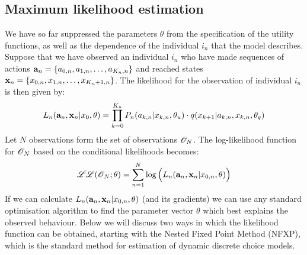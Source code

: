 
\subsection{Maximum likelihood estimation}
We have so far suppressed the parameters $\theta$ from the specification of the utility functions, as well as the dependence of the individual $i_n$ that the model describes. 
Suppose that we have observed an individual $i_n$ who have made sequences of actions ${\bf a}_n=\{a_{0,n},a_{1,n},\dots,a_{K_n,n}\}$ and reached states ${\bf x}_n=\{x_{0,n},x_{1,n},\dots,x_{K_n+1,n}\}$. The likelihood for the observation of individual $i_n$ is then given by:
\begin{equation*}
    L_n(\ve{a}_n,\ve{x}_n|x_0,\theta)= \prod_{k=0}^{K_n}  P_n(a_{k,n}|x_{k,n},\theta_u)\cdot q(x_{k+1}|a_{k,n},x_{k,n},\theta_q)
\end{equation*}
Let $N$ observations form the set of observations $\mathscr{O}_N$. The log-likelihood function for $\mathscr{O}_N$ based on the conditional likelihoods becomes:
\begin{equation*} \label{eq:cond_like}
\bar{\LL}(\obs_N;\theta) = \sum_{n=1}^N \log \Bl L_n(\ve{a}_n,\ve{x}_n|x_{0,n},\theta)\Bh
\end{equation*}
If we can calculate $L_n({\bf a}_n,{\bf x}_n|x_{0,n},\theta)$ (and its gradients) we can use any standard optimisation algorithm to find the parameter vector $\theta$ which best explains the observed behaviour. Below we will discuss two ways in which the likelihood function can be obtained, starting with the Nested Fixed Point Method (NFXP), which is the standard method for estimation of dynamic discrete choice models.

